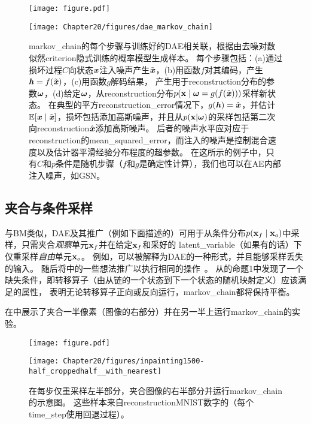 \begin{figure}[!htb]
\ifOpenSource
\centerline{\texttt{[image: figure.pdf]}}
\else
\centerline{\texttt{[image: Chapter20/figures/dae\_markov\_chain]}}
\fi
\caption{\gls{markov_chain}的每个步骤与训练好的\gls{DAE}相关联，根据由去噪对数似然\gls{criterion}隐式训练的概率模型生成样本。
每个步骤包括：(a)通过损坏过程$C$向状态$\boldsymbol{\mathit{x}}$注入噪声产生$\tilde{\boldsymbol{\mathit{x}}}$，(b)用函数$f$对其编码，产生$\boldsymbol{\mathit{h}} = f(\tilde{\boldsymbol{\mathit{x}}})$，(c)用函数$g$解码结果， 产生用于\gls{reconstruction}分布的参数$\boldsymbol{\omega}$，(d)给定$\boldsymbol{\omega}$，从\gls{reconstruction}分布$p(\mathbf{x} \mid \boldsymbol{\omega} = g(f(\tilde{\boldsymbol{\mathit{x}}})))$采样新状态。
在典型的平方\gls{reconstruction_error}情况下，$g(\boldsymbol{\mathit{h}}) = \hat{\boldsymbol{\mathit{x}}}$，并估计$\mathbb{E} [ \boldsymbol{\mathit{x}} \mid \tilde{\boldsymbol{\mathit{x}}}]$，损坏包括添加高斯噪声，并且从$p(\mathbf{x} | \boldsymbol{\omega})$的采样包括第二次向\gls{reconstruction}$\hat{\boldsymbol{\mathit{x}}}$添加高斯噪声。
后者的噪声水平应对应于\gls{reconstruction}的\gls{mean_squared_error}，而注入的噪声是控制混合速度以及估计器平滑经验分布程度的超参数\citep{Vincent-NC-2011-small}。
在这所示的例子中，只有$C$和$p$条件是随机步骤（$f$和$g$是确定性计算），我们也可以在\gls{AE}内部注入噪声，如\gls{GSN}\citep{Bengio-et-al-ICML-2014}。
}
\label{fig:chap20_dae_markov_chain}
\end{figure}


\subsection{夹合与条件采样}
\label{sec:clamping_and_conditional_sampling}

与\gls{BM}类似，\gls{DAE}及其推广（例如下面描述的）可用于从条件分布$p(\mathbf{x}_f  \mid  \mathbf{x}_o)$中采样，只需夹合\emph{观察}单元$\mathbf{x}_f$并在给定$\mathbf{x}_f$和采好的 \gls{latent_variable}（如果有的话）下仅重采样\emph{自由}单元$\mathbf{x}_o$。
例如，可以被解释为\gls{DAE}的一种形式，并且能够采样丢失的输入。
随后将中的一些想法推广以执行相同的操作~\citep{Bengio-et-al-ICML-2014}。
\citet{Alain-et-al-arxiv2015} 从\citet{Bengio-et-al-ICML-2014}的命题1中发现了一个缺失条件，即转移算子（由从链的一个状态到下一个状态的随机映射定义）应该满足的属性， 表明无论转移算子正向或反向运行，\gls{markov_chain}都将保持平衡。

在中展示了夹合一半像素（图像的右部分）并在另一半上运行\gls{markov_chain}的实验。

\begin{figure}[!htb]
\ifOpenSource
\centerline{\texttt{[image: figure.pdf]}}
\else
\centerline{\texttt{[image: Chapter20/figures/inpainting1500-half\_croppedhalf\_\_with\_nearest]}}
\fi
\caption{在每步仅重采样左半部分，夹合图像的右半部分并运行\gls{markov_chain}的示意图。
这些样本来自\gls{reconstruction}MNIST数字的（每个\gls{time_step}使用回退过程）。
}
\label{fig:chap20_inpainting1500-half_croppedhalf__with_nearest}
\end{figure}

